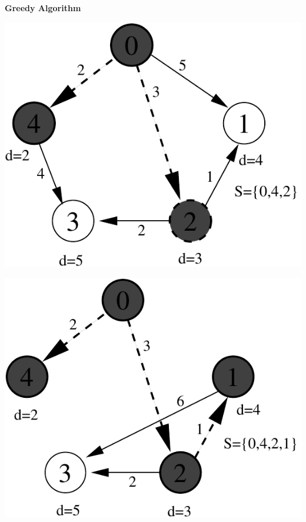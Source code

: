 \documentclass[a4,portraitt]{slides}
\begin{document}
\newpage
{\samepage
\begin{center}
{\Large{\bf Greedy Algorithm}}
\end{center}

\begin{center}
\includegraphics{../Images/graphd.pdf}
\end{center}

\begin{center}
\includegraphics{../Images/graphe.pdf}
\end{center}
}
\end{document}
